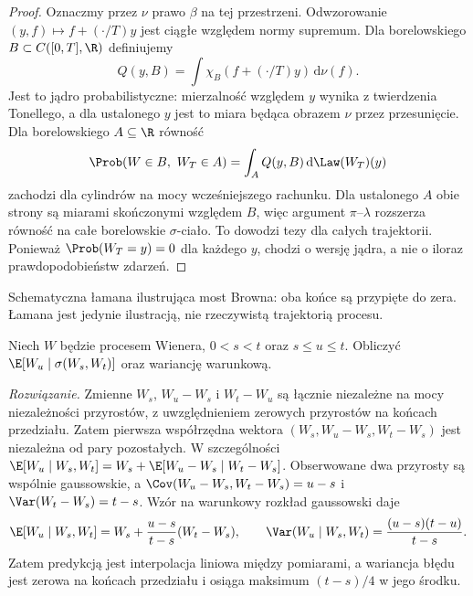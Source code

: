 \begin{proof}
Oznaczmy przez $\nu$ prawo $\beta$ na tej przestrzeni.
Odwzorowanie
$(y,f)\mapsto f+(\cdot/T)y$ jest ciągłe względem
normy supremum. Dla borelowskiego $B\subset C([0,T],\R)$
definiujemy
\[
Q(y,B)=\int\chi_B(f+(\cdot/T)y)\,\mathrm d\nu(f).
\]
Jest to jądro probabilistyczne: mierzalność względem $y$
wynika z twierdzenia Tonellego, a dla ustalonego $y$
jest to miara będąca obrazem $\nu$ przez przesunięcie.
Dla borelowskiego $A\subseteq\R$ równość
\[
\Prob(W\in B,\ W_T\in A)
=\int_A Q(y,B)\,\mathrm d\Law(W_T)(y)
\]
zachodzi dla cylindrów na mocy wcześniejszego rachunku.
Dla ustalonego $A$ obie strony są miarami skończonymi
względem $B$, więc argument $\pi$--$\lambda$ rozszerza
równość na całe borelowskie $\sigma$-ciało.
To dowodzi tezy dla całych trajektorii. Ponieważ
$\Prob(W_T=y)=0$ dla każdego $y$, chodzi o wersję
jądra, a nie o iloraz prawdopodobieństw zdarzeń.
\end{proof}

\begin{center}
\par\smallskip\small Schematyczna łamana ilustrująca most Browna: oba końce są
przypięte do zera. Łamana jest jedynie ilustracją, nie
rzeczywistą trajektorią procesu.
\end{center}

\begin{zadanie}
Niech $W$ będzie procesem Wienera, $0<s<t$ oraz $s\le u\le t$.
Obliczyć $\E[W_u\mid\sigma(W_s,W_t)]$ oraz wariancję warunkową.

\emph{Rozwiązanie.} Zmienne $W_s$, $W_u-W_s$ i $W_t-W_u$
są łącznie niezależne na mocy niezależności przyrostów, z uwzględnieniem zerowych
przyrostów na końcach przedziału. Zatem pierwsza
współrzędna wektora $(W_s,W_u-W_s,W_t-W_s)$
jest niezależna od pary pozostałych. W szczególności
$\E[W_u\mid W_s,W_t]=W_s+\E[W_u-W_s\mid W_t-W_s]$.
Obserwowane dwa przyrosty są wspólnie gaussowskie,
a $\Cov(W_u-W_s,W_t-W_s)=u-s$ i
$\Var(W_t-W_s)=t-s$.
Wzór na warunkowy rozkład gaussowski daje
\[
\E[W_u\mid W_s,W_t]
=W_s+\frac{u-s}{t-s}(W_t-W_s),\qquad
\Var(W_u\mid W_s,W_t)=\frac{(u-s)(t-u)}{t-s}.
\]
Zatem predykcją jest interpolacja liniowa między pomiarami,
a wariancja błędu jest zerowa na końcach przedziału
i osiąga maksimum $(t-s)/4$ w jego środku.
\end{zadanie}

